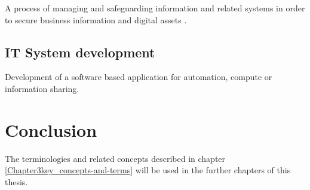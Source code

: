 A process of managing and safeguarding information 
and related systems 
in order to secure business information 
and digital assets
\citep{humphreys2016implementing}.

\subsection{IT System development}	

Development of a software based application for automation, 
compute or information sharing.

\section{Conclusion }
The terminologies and related concepts
described in chapter \ref{Chapter3key_concepts-and-terms} 
will be used in the further chapters
of this thesis.

